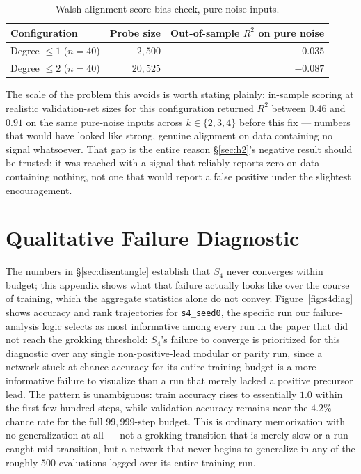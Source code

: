\documentclass{article}
\begin{document}
\begin{table}[h]
\caption{Walsh alignment score bias check, pure-noise inputs.}
\label{tab:walshbias}
\centering
\small
\begin{tabular}{@{}lrr@{}}
\toprule
Configuration & Probe size & Out-of-sample $R^2$ on pure noise \\
\midrule
Degree $\le\!1$ ($n=40$) & $2{,}500$ & $-0.035$ \\
Degree $\le\!2$ ($n=40$) & $20{,}525$ & $-0.087$ \\
\bottomrule
\end{tabular}
\end{table}

The scale of the problem this avoids is worth stating plainly: in-sample
scoring at realistic validation-set sizes for this configuration returned
$R^2$ between $0.46$ and $0.91$ on the same pure-noise inputs across
$k\in\{2,3,4\}$ before this fix --- numbers that would have looked like
strong, genuine alignment on data containing no signal whatsoever. That
gap is the entire reason \S\ref{sec:h2}'s negative result should be
trusted: it was reached with a signal that reliably reports zero on data
containing nothing, not one that would report a false positive under the
slightest encouragement.

\FloatBarrier
\section{Qualitative Failure Diagnostic}
\label{app:s4failure}

The numbers in \S\ref{sec:disentangle} establish that $S_4$ never
converges within budget; this appendix shows what that failure actually
looks like over the course of training, which the aggregate statistics
alone do not convey. Figure~\ref{fig:s4diag} shows accuracy and rank
trajectories for \texttt{s4\_seed0}, the specific run our failure-analysis
logic selects as most informative among every run in the paper that did
not reach the grokking threshold: $S_4$'s failure to converge is
prioritized for this diagnostic over any single non-positive-lead modular
or parity run, since a network stuck at chance accuracy for its entire
training budget is a more informative failure to visualize than a run
that merely lacked a positive precursor lead. The pattern is unambiguous:
train accuracy rises to essentially $1.0$ within the first few hundred
steps, while validation accuracy remains near the $4.2\%$ chance rate for
the full $99{,}999$-step budget. This is ordinary memorization with no
generalization at all --- not a grokking transition that is merely slow
or a run caught mid-transition, but a network that never begins to
generalize in any of the roughly $500$ evaluations logged over its entire
training run.
\end{document}
